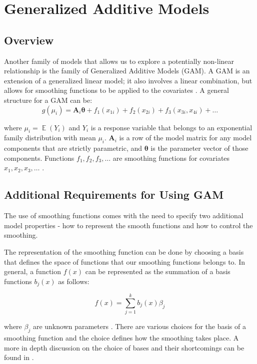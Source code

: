 \section{Generalized Additive Models}

\subsection{Overview}
Another family of models that allows us to explore a potentially non-linear relationship is the family of Generalized Additive Models (GAM). A GAM is an extension of a generalized linear model; it also involves a linear combination, but allows for smoothing functions to be applied to the covariates \citep{hastie2017generalized}. A general structure for a GAM can be: 
\setlength\abovedisplayskip{4pt}
\setlength\belowdisplayskip{4pt}
\begin{equation*}
g\left(\mu_{i}\right)=\mathbf{A}_{i} \boldsymbol{\theta}+f_{1}\left(x_{1 i}\right)+f_{2}\left(x_{2 i}\right)+f_{3}\left(x_{3 i}, x_{4 i}\right)+\ldots
\end{equation*}

where $\mu_{i} = \mathop{\mathbb{E}}(Y_i)$  and $Y_i$ is a response variable that belongs to an exponential family distribution with mean $\mu_{i}$. $\mathbf{A}_{i}$ is a row of the model matrix for any model components that are strictly parametric, and $\boldsymbol{\theta}$ is the parameter vector of those components. Functions $f_1, f_2, f_3, \ldots$ are smoothing functions for covariates $x_1, x_2, x_3, \ldots$  \citep{wood2017generalized}. 

\subsection{Additional Requirements for Using GAM}

The use of smoothing functions comes with the need to specify two additional model properties - how to represent the smooth functions and how to control the smoothing. 

The representation of the smoothing function can be done by choosing a basis that defines the space of functions that our smoothing functions belongs to. In general, a function $f(x)$ can be represented as the summation of a basis functions $b_{j}(x)$ as follows: 

$$
f(x)=\sum_{j=1}^{k} b_{j}(x) \beta_{j}
$$

where $\beta_{j}$ are unknown parameters  \citep{wood2017generalized}. There are various choices for the basis of a smoothing function and the choice defines how the smoothing takes place. A more in depth discussion on the choice of bases and their shortcomings can be found in . 

